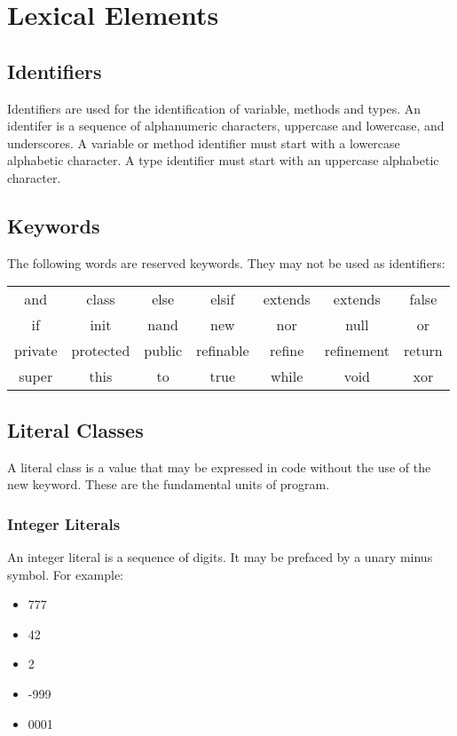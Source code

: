 \section{Lexical Elements}
\subsection{Identifiers}
Identifiers are used for the identification of variable,  methods and types. An identifer is a sequence of alphanumeric characters, uppercase and lowercase, and underscores. A variable or method identifier must start with a lowercase alphabetic character. A type identifier must start with an uppercase alphabetic character.

\subsection{Keywords}
The following words are reserved keywords. They may not be used as identifiers:
\begin{center}
\begin{tabular}{ccccccc}
and & class & else & elsif & extends & extends & false\\
if & init & nand & new & nor & null & or\\
private & protected & public & refinable & refine & refinement & return\\
super & this & to & true & while & void & xor\\
\end{tabular}
\end{center}

\subsection{Literal Classes}
A literal class is a value that may be expressed in code without the use of the new keyword. These are the fundamental units of program.

\subsubsection{Integer Literals}
An integer literal is a sequence of digits. It may be prefaced by a unary minus symbol. For example:
\begin{itemize}
\item 777
\item 42
\item 2
\item -999
\item 0001
\end{itemize}